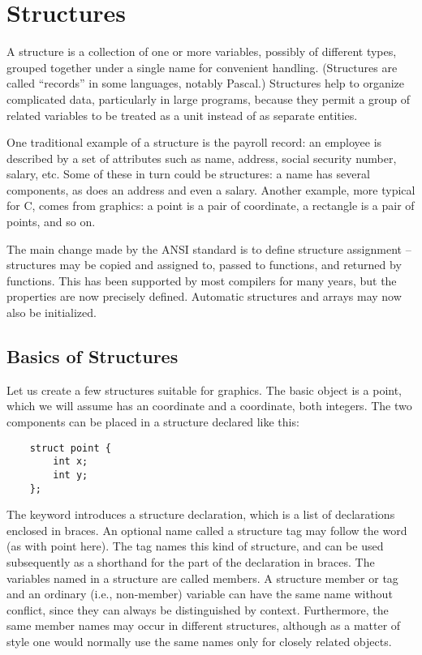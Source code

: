 

\chapter{Structures}


A structure is a collection of one or more variables, possibly of different types, grouped together under a single name for convenient handling.
(Structures are called ``records'' in some languages, notably Pascal.)
Structures help to organize complicated data, particularly in large programs, because they permit a group of related variables to be treated as a unit instead of as separate entities.

One traditional example of a structure is the payroll record: an employee is described by a set of attributes such as name, address, social security number, salary, etc.
Some of these in turn could be structures: a name has several components, as does an address and even a salary.
Another example, more typical for C, comes from graphics: a point is a pair of coordinate, a rectangle is a pair of points, and so on.

The main change made by the ANSI standard is to define structure assignment -- structures may be copied and assigned to, passed to functions, and returned by functions.
This has been supported by most compilers for many years, but the properties are now precisely defined. Automatic structures and arrays may now also be initialized.

\section{Basics of Structures}

Let us create a few structures suitable for graphics. The basic object is a point, which we will assume has an  coordinate and a  coordinate, both integers.
The two components can be placed in a structure declared like this:
\begin{lstlisting}
	struct point {
		int x;
		int y;
	};
\end{lstlisting}
The keyword  introduces a structure declaration, which is a list of declarations enclosed in braces.
An optional name called a structure tag may follow the word  (as with point here).
The tag names this kind of structure, and can be used subsequently as a shorthand for the part of the declaration in braces.
The variables named in a structure are called members.
A structure member or tag and an ordinary (i.e., non-member) variable can have the same name without conflict, since they can always be distinguished by context.
Furthermore, the same member names may occur in different structures, although as a matter of style one would normally use the same names only for closely related objects.

